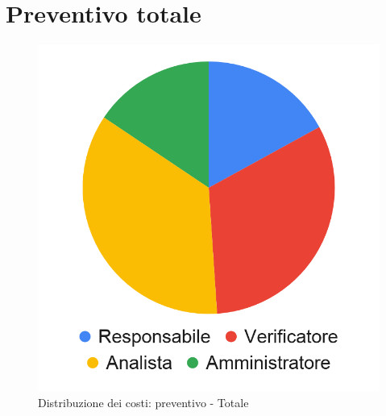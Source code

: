 \section{Preventivo totale}

\hspace{-1cm}
\begin{minipage}{.50\textwidth}
	\smallPreventivoTable{
		
	}
\end{minipage}
\hspace{1cm}
\begin{minipage}{.60\textwidth}
	\begin{figure}[H]
		\includegraphics[scale=0.21]{res/images/charts/preventivo_priori/Grafico4-12.png}
		\caption{Distribuzione dei costi: preventivo - Totale}
	\end{figure}
\end{minipage} 